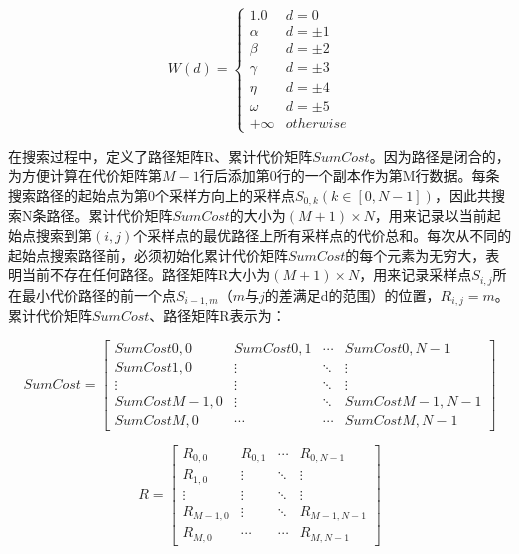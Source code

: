\documentclass[nomlist,masters]{seuthesix}
\begin{document}
\begin{equation}
W(d)=\left\{\begin{matrix}
1.0 & d = 0\\ 
 \alpha & d=\pm 1\\ 
\beta  & d=\pm 2\\ 
 \gamma & d=\pm 3\\ 
 \eta & d=\pm 4\\ 
 \omega & d=\pm 5\\ 
 +\infty & otherwise
\end{matrix}\right.
\label{W}
\end{equation}

在搜索过程中，定义了路径矩阵R、累计代价矩阵$SumCost$。因为路径是闭合的，为方便计算在代价矩阵第$M-1$行后添加第0行的一个副本作为第M行数据。每条搜索路径的起始点为第0个采样方向上的采样点$S_{0,k}(k\in [0,N-1])$，因此共搜索N条路径。累计代价矩阵$SumCost$的大小为$(M+1)\times N$，用来记录以当前起始点搜索到第$(i,j)$个采样点的最优路径上所有采样点的代价总和。每次从不同的起始点搜索路径前，必须初始化累计代价矩阵$SumCost$的每个元素为无穷大，表明当前不存在任何路径。路径矩阵R大小为$(M+1)\times N$，用来记录采样点$S_{i,j}$所在最小代价路径的前一个点$S_{i-1,m}$（$m$与$j$的差满足d的范围）的位置，$R_{i,j}=m$。累计代价矩阵$SumCost$、路径矩阵R表示为：

\begin{equation}
SumCost=\begin{bmatrix}
SumCost{0,0} & SumCost{0,1} &  \cdots & SumCost{0,N-1}\\ 
SumCost{1,0} &  \vdots &  \ddots & \vdots\\ 
 \vdots &  \vdots &  \ddots & \vdots \\ 
SumCost{M-1,0} &  \vdots &  \ddots & SumCost{M-1,N-1}\\
SumCost{M,0} &  \cdots &  \cdots & SumCost{M,N-1}
\end{bmatrix}
\label{SumCost}
\end{equation}

\begin{equation}
R=\begin{bmatrix}
R_{0,0} & R_{0,1} &  \cdots & R_{0,N-1}\\ 
R_{1,0} &  \vdots &  \ddots & \vdots\\ 
 \vdots &  \vdots &  \ddots & \vdots \\ 
R_{M-1,0} &  \vdots &  \ddots & R_{M-1,N-1}\\
R_{M,0} &  \cdots &  \cdots & R_{M,N-1}
\end{bmatrix}
\label{R}
\end{equation}
\end{document}
